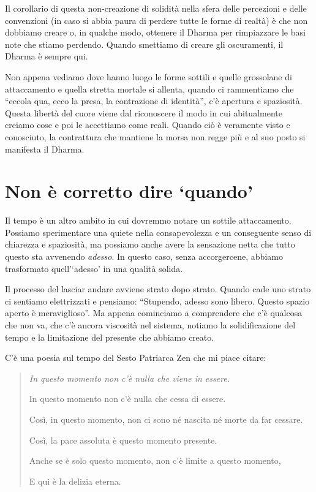 Il corollario di questa non-creazione di solidità nella sfera delle percezioni e delle convenzioni (in caso si abbia paura di perdere tutte le forme di realtà) è che non dobbiamo creare o, in qualche modo, ottenere il Dharma per rimpiazzare le basi note che stiamo perdendo. Quando smettiamo di creare gli oscuramenti, il Dharma è sempre qui.

Non appena vediamo dove hanno luogo le forme sottili e quelle grossolane di attaccamento e quella stretta mortale si allenta, quando ci rammentiamo che ``eccola qua, ecco la presa, la contrazione di identità'', c'è apertura e spaziosità. Questa libertà del cuore viene dal riconoscere il modo in cui abitualmente creiamo cose e poi le accettiamo come reali. Quando ciò è veramente visto e conosciuto, la contrattura che mantiene la morsa non regge più e al suo posto si manifesta il Dharma.

\section*{Non \`e corretto dire `quando' }

Il tempo è un altro ambito in cui dovremmo notare un sottile attaccamento. Possiamo sperimentare una quiete nella consapevolezza e un conseguente senso di chiarezza e spaziosità, ma possiamo anche avere la sensazione netta che tutto questo sta avvenendo \textit{adesso}. In questo caso, senza accorgercene, abbiamo trasformato quell'`adesso' in una qualità solida.

Il processo del lasciar andare avviene strato dopo strato. Quando cade uno strato ci sentiamo elettrizzati e pensiamo: ``Stupendo, adesso sono libero. Questo spazio aperto è meraviglioso''. Ma appena cominciamo a comprendere che c'è qualcosa che non va, che c'è ancora viscosità nel sistema, notiamo la solidificazione del tempo e la limitazione del presente che abbiamo creato.

C'è una poesia sul tempo del Sesto Patriarca Zen che mi piace citare: 

\begin{quote}
\itshape
In questo momento non c'è nulla che viene in essere.

In questo momento non c'è nulla che cessa di essere.

Così, in questo momento, non ci sono né nascita né morte da far cessare.

Così, la pace assoluta è questo momento presente.

Anche se è solo questo momento, non c'è limite a questo momento,

E qui è la delizia eterna.
\end{quote}


